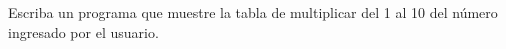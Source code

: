 Escriba un programa que muestre
la tabla de multiplicar del 1 al 10
del número ingresado por el usuario.

\begin{minipage}[t]{.40\textwidth}
  
\end{minipage}
